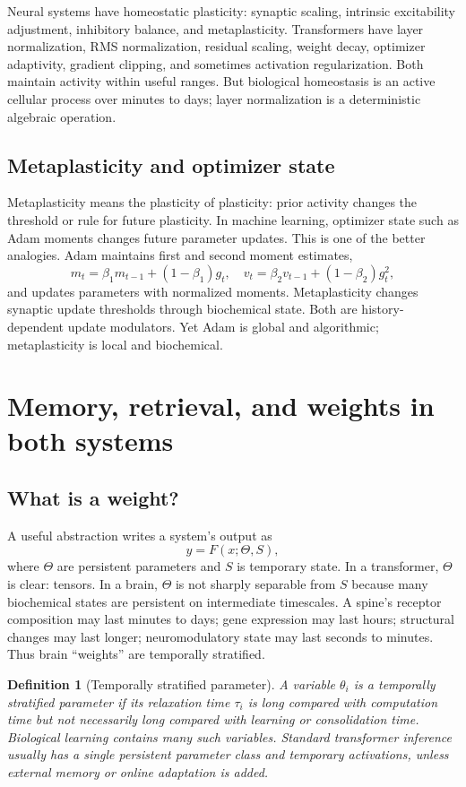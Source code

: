 \documentclass[11pt]{article}
\newtheorem{definition}{Definition}[section]
\newcommand{\1}{\mathbf{1}}
\begin{document}
Neural systems have homeostatic plasticity: synaptic scaling, intrinsic excitability adjustment, inhibitory balance, and metaplasticity. Transformers have layer normalization, RMS normalization, residual scaling, weight decay, optimizer adaptivity, gradient clipping, and sometimes activation regularization. Both maintain activity within useful ranges. But biological homeostasis is an active cellular process over minutes to days; layer normalization is a deterministic algebraic operation.

\subsection{Metaplasticity and optimizer state}

Metaplasticity means the plasticity of plasticity: prior activity changes the threshold or rule for future plasticity. In machine learning, optimizer state such as Adam moments changes future parameter updates. This is one of the better analogies. Adam maintains first and second moment estimates,
\[
m_t=\beta_1m_{t-1}+(1-\beta_1)g_t,
\quad
v_t=\beta_2v_{t-1}+(1-\beta_2)g_t^2,
\]
and updates parameters with normalized moments. Metaplasticity changes synaptic update thresholds through biochemical state. Both are history-dependent update modulators. Yet Adam is global and algorithmic; metaplasticity is local and biochemical.

\section{Memory, retrieval, and weights in both systems}

\subsection{What is a weight?}

A useful abstraction writes a system's output as
\[
y=F(x;\Theta,S),
\]
where $\Theta$ are persistent parameters and $S$ is temporary state. In a transformer, $\Theta$ is clear: tensors. In a brain, $\Theta$ is not sharply separable from $S$ because many biochemical states are persistent on intermediate timescales. A spine's receptor composition may last minutes to days; gene expression may last hours; structural changes may last longer; neuromodulatory state may last seconds to minutes. Thus brain ``weights'' are temporally stratified.

\begin{definition}[Temporally stratified parameter]
A variable $\theta_i$ is a temporally stratified parameter if its relaxation time $\tau_i$ is long compared with computation time but not necessarily long compared with learning or consolidation time. Biological learning contains many such variables. Standard transformer inference usually has a single persistent parameter class and temporary activations, unless external memory or online adaptation is added.
\end{definition}
\end{document}
